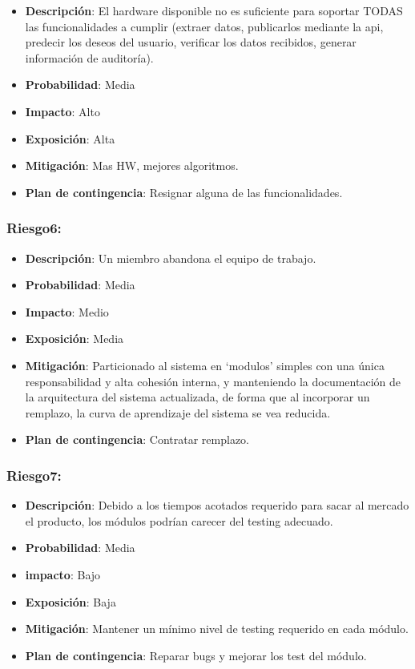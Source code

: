 \begin{itemize}
\itemsep1pt\parskip0pt
\item
  \textbf{Descripción}: El hardware disponible no es suficiente para
  soportar TODAS las funcionalidades a cumplir (extraer datos,
  publicarlos mediante la api, predecir los deseos del usuario,
  verificar los datos recibidos, generar información de auditoría).
\item
  \textbf{Probabilidad}: Media
\item
  \textbf{Impacto}: Alto
\item
  \textbf{Exposición}: Alta
\item
  \textbf{Mitigación}: Mas HW, mejores algoritmos.
\item
  \textbf{Plan de contingencia}: Resignar alguna de las funcionalidades.
\end{itemize}

\subsubsection{Riesgo6:}

\begin{itemize}
\itemsep1pt\parskip0pt
\item
  \textbf{Descripción}: Un miembro abandona el equipo de trabajo.
\item
  \textbf{Probabilidad}: Media
\item
  \textbf{Impacto}: Medio
\item
  \textbf{Exposición}: Media
\item
  \textbf{Mitigación}: Particionado al sistema en `modulos' simples con
  una única responsabilidad y alta cohesión interna, y manteniendo la
  documentación de la arquitectura del sistema actualizada, de forma que
  al incorporar un remplazo, la curva de aprendizaje del sistema se vea
  reducida.
\item
  \textbf{Plan de contingencia}: Contratar remplazo.
\end{itemize}

\subsubsection{Riesgo7:}

\begin{itemize}
\itemsep1pt\parskip0pt
\item
  \textbf{Descripción}: Debido a los tiempos acotados requerido para
  sacar al mercado el producto, los módulos podrían carecer del testing
  adecuado.
\item
  \textbf{Probabilidad}: Media
\item
  \textbf{impacto}: Bajo
\item
  \textbf{Exposición}: Baja
\item
  \textbf{Mitigación}: Mantener un mínimo nivel de testing requerido en
  cada módulo.
\item
  \textbf{Plan de contingencia}: Reparar bugs y mejorar los test del
  módulo.
\end{itemize}

